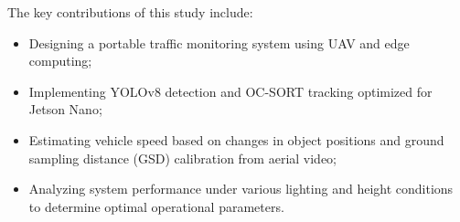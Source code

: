 The key contributions of this study include:
\begin{itemize}
  \item Designing a portable traffic monitoring system using UAV and edge computing;
  \item Implementing YOLOv8 detection and OC-SORT tracking optimized for Jetson Nano;
  \item Estimating vehicle speed based on changes in object positions and ground sampling distance (GSD) calibration from aerial video;
  \item Analyzing system performance under various lighting and height conditions to determine optimal operational parameters.
\end{itemize}

